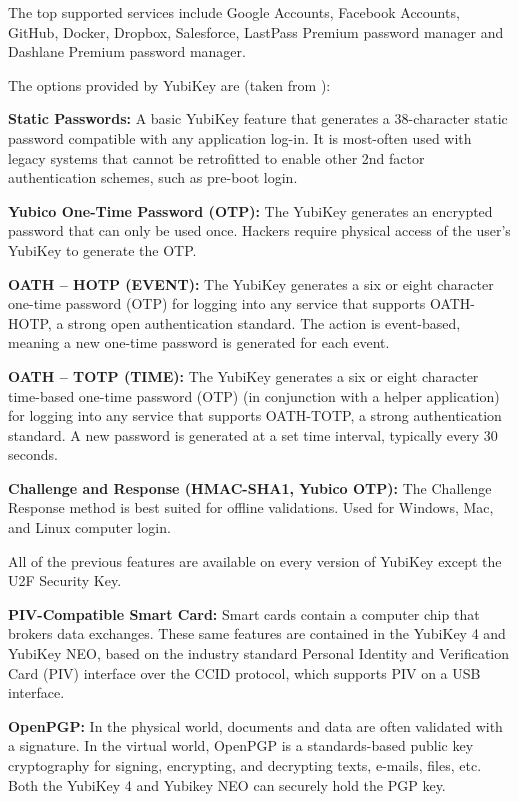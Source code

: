 The top supported services include Google Accounts, Facebook Accounts, GitHub, Docker, Dropbox, Salesforce, LastPass Premium password manager and Dashlane Premium password manager.

The options provided by YubiKey are (taken from \cite{yubiworks}):

\textbf{Static Passwords: }A basic YubiKey feature that generates a 38-character static password compatible with any application log-in. It is most-often used with legacy systems that cannot be retrofitted to enable other 2nd factor authentication schemes, such as pre-boot login. 

\textbf{Yubico One-Time Password (OTP): }The YubiKey generates an encrypted password that can only be used once. Hackers require physical access of the user's YubiKey to generate the OTP. 

\textbf{OATH – HOTP (EVENT): }
The YubiKey generates a six or eight character one-time password (OTP) for logging into any service that supports OATH-HOTP, a strong open authentication standard. The action is event-based, meaning a new one-time password is generated for each event.

\textbf{OATH – TOTP (TIME): }
The YubiKey generates a six or eight character time-based one-time password (OTP) (in conjunction with a helper application) for logging into any service that supports OATH-TOTP, a strong authentication standard. A new password is generated at a set time interval, typically every 30 seconds.

\textbf{Challenge and Response (HMAC-SHA1, Yubico OTP): }
The Challenge Response method is best suited for offline validations. Used for Windows, Mac, and Linux computer login.

\vspace{10pt}

All of the previous features are available on every version of YubiKey except the U2F Security Key.

\textbf{PIV-Compatible Smart Card: }
Smart cards contain a computer chip that brokers data exchanges. These same features are contained in the YubiKey 4 and YubiKey NEO, based on the industry standard Personal Identity and Verification Card (PIV) interface over the CCID protocol, which supports PIV on a USB interface.

\textbf{OpenPGP: }
In the physical world, documents and data are often validated with a signature. In the virtual world, OpenPGP is a standards-based public key cryptography for signing, encrypting, and decrypting texts, e-mails, files, etc. Both the YubiKey 4 and Yubikey NEO can securely hold the PGP key.

